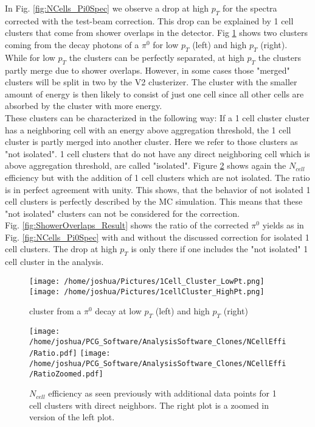 \documentclass[ALICE]{ALICE_analysis_notes}
\begin{document}
In Fig. \ref{fig:NCells_Pi0Spec} we observe a drop at high $p_{T}$ for the spectra corrected with the test-beam correction. This drop can be explained by 1 cell clusters that come from shower overlaps in the detector. Fig \ref{fig:ShowerOverlaps} shows two clusters coming from the decay photons of a $\pi^{0}$ for low $p_{T}$ (left) and high $p_{T}$ (right). While for low $p_{T}$ the clusters can be perfectly separated, at high $p_{T}$ the clusters partly merge due to shower overlaps. However, in some cases those "merged" clusters will be split in two by the V2 clusterizer. The cluster with the smaller amount of energy is then likely to consist of just one cell since all other cells are absorbed by the cluster with more energy. \\
These clusters can be characterized in the following way: If a 1 cell cluster cluster has a neighboring cell with an energy above aggregation threshold, the 1 cell cluster is partly merged into another cluster. Here we refer to those clusters as "not isolated". 1 cell clusters that do not have any direct neighboring cell which is above aggregation threshold, are called "isolated".
Figure \ref{fig:ShowerOverlapsEffi} shows again the $N_{cell}$ efficiency but with the addition of 1 cell clusters which are not isolated. The ratio is in perfect agreement with unity. This shows, that the behavior of not isolated 1 cell clusters is perfectly described by the MC simulation. This means that these "not isolated" clusters can not be considered for the correction. \\
Fig. \ref{fig:ShowerOverlaps_Result} shows the ratio of the corrected $\pi^{0}$ yields as in Fig. \ref{fig:NCells_Pi0Spec} with and without the discussed correction for isolated 1 cell clusters. The drop at high $p_{T}$ is only there if one includes the "not isolated" 1 cell cluster in the analysis. 

\begin{figure}[h!]
	\centering
	\texttt{[image: /home/joshua/Pictures/1Cell\_Cluster\_LowPt.png]}
	\texttt{[image: /home/joshua/Pictures/1cellCluster\_HighPt.png]}
	
	\caption{ cluster from a $\pi^{0}$ decay at low $p_{T}$ (left) and high $p_{T}$ (right)}
	\label{fig:ShowerOverlaps}
\end{figure}



\begin{figure}[h!]
	\centering
	\texttt{[image: /home/joshua/PCG\_Software/AnalysisSoftware\_Clones/NCellEffi/Ratio.pdf]}
	\texttt{[image: /home/joshua/PCG\_Software/AnalysisSoftware\_Clones/NCellEffi/RatioZoomed.pdf]}
	
	\caption{ $N_{cell}$ efficiency as seen previously with additional data points for 1 cell clusters with direct neighbors. The right plot is a zoomed in version of the left plot.}
	\label{fig:ShowerOverlapsEffi}
\end{figure}
\end{document}
